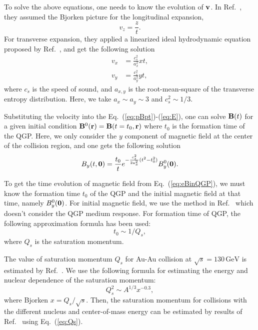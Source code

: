 \documentclass[a4paper,10pt,twoside]{cpc-hepnp}
\begin{document}
\begin{CJK*}{GBK}{song}
\begin{multicols}{2}
To solve the above equations, one needs to know the evolution of $\vb{v}$. In Ref.~\cite{Deng:2012pc}, they assumed the Bjorken picture for the longitudinal expansion,
\begin{equation}
v_z = \frac{z}{t}.
\end{equation}
For transverse expansion, they applied a linearized ideal hydrodynamic equation proposed by Ref.~\cite{Ollitrault:2008zz}, and get the following solution
\begin{align}
v_x &= \frac{c_s^2}{a_x^2} xt, \\
v_y &= \frac{c_s^2}{a_y^2} yt,
\end{align}
where $c_s$ is the speed of sound, and $a_{x,y}$ is the root-mean-square of the transverse entropy distribution. Here, we take $a_x \sim a_y \sim 3$ and $c_s^2 \sim 1/3$.

Substituting the velocity into the Eq.~(\ref{eq:pBpt})-(\ref{eq:E}), one can solve $\vb{B}(t)$ for a given initial condition $\vb{B}^0(\vb{r}) = \vb{B}(t=t_0, \vb{r})$ where $t_0$ is the formation time of the QGP. Here, we only consider the $y$ component of magnetic field at the center of the collision region, and one gets the following solution
\begin{equation}
B_y(t,\vb{0}) = \frac{t_0}{t} e^{-\frac{c_s^2}{2a_x^2}(t^2 - t_0^2)} B_y^0(\vb{0}). \label{eq:eBinQGP}
\end{equation}

To get the time evolution of magnetic field from Eq.~(\ref{eq:eBinQGP}), we must know the formation time $t_0$ of the QGP and the initial magnetic field at that time, namely $B_y^0(\vb{0})$. For initial magnetic field, we use the method in Ref.~\cite{Mo:2013qya} which doesn't consider the QGP medium response. For formation time of QGP, the following approximation formula has been used:
\begin{equation}
t_0 \sim 1 / Q_{s},
\end{equation}
where $Q_s$ is the saturation momentum.

The value of saturation momentum $Q_s$ for Au-Au collision at $\sqrt{s} = 130\,\mathrm{GeV}$ is estimated by Ref.~\cite{Kharzeev:2000ph}. We use the following formula for estimating the energy and nuclear dependence of the saturation momentum\cite{Kowalski:2007rw}:
\begin{equation}
Q_s^2 \sim A^{1/3} x^{-0.3}, \label{eq:Qs}
\end{equation}
where Bjorken $x = Q_s/\sqrt{s}$. Then, the saturation momentum for collisions with the different nucleus and center-of-mass energy can be estimated by results of Ref.~\cite{Kharzeev:2000ph} using Eq.~(\ref{eq:Qs}).


\end{multicols}
\end{CJK*}
\end{document}
